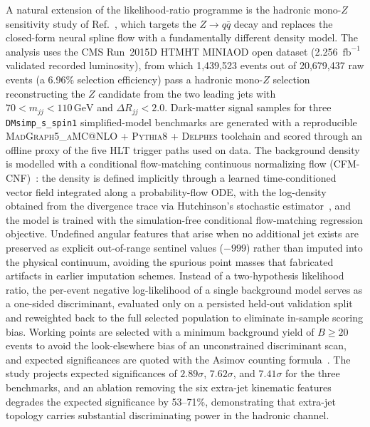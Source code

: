 \documentclass[11pt,a4paper,twocolumn]{article}
\newcommand{\GeV}{\text{GeV}}
\begin{document}
A natural extension of the likelihood-ratio programme is the hadronic mono-$Z$ sensitivity study of Ref.~\cite{Rasineni2026HadronicFlowMatching}, which targets the $Z\to q\bar{q}$ decay and replaces the closed-form neural spline flow with a fundamentally different density model. The analysis uses the CMS Run~2015D HTMHT MINIAOD open dataset (2.256~$\mathrm{fb}^{-1}$ validated recorded luminosity), from which 1{,}439{,}523 events out of 20{,}679{,}437 raw events (a 6.96\% selection efficiency) pass a hadronic mono-$Z$ selection reconstructing the $Z$ candidate from the two leading jets with $70 < m_{jj} < 110\,\GeV$ and $\Delta R_{jj} < 2.0$. Dark-matter signal samples for three \texttt{DMsimp\_s\_spin1} simplified-model benchmarks are generated with a reproducible \textsc{MadGraph5\_aMC@NLO} + \textsc{Pythia8} + \textsc{Delphes} toolchain and scored through an offline proxy of the five HLT trigger paths used on data. The background density is modelled with a conditional flow-matching continuous normalizing flow (CFM-CNF)~\cite{Lipman2023FlowMatching,Chen2018NeuralODE}: the density is defined implicitly through a learned time-conditioned vector field integrated along a probability-flow ODE, with the log-density obtained from the divergence trace via Hutchinson's stochastic estimator~\cite{Grathwohl2019FFJORD}, and the model is trained with the simulation-free conditional flow-matching regression objective. Undefined angular features that arise when no additional jet exists are preserved as explicit out-of-range sentinel values ($-999$) rather than imputed into the physical continuum, avoiding the spurious point masses that fabricated artifacts in earlier imputation schemes. Instead of a two-hypothesis likelihood ratio, the per-event negative log-likelihood of a single background model serves as a one-sided discriminant, evaluated only on a persisted held-out validation split and reweighted back to the full selected population to eliminate in-sample scoring bias. Working points are selected with a minimum background yield of $B\geq 20$ events to avoid the look-elsewhere bias of an unconstrained discriminant scan, and expected significances are quoted with the Asimov counting formula~\cite{Cowan2011Asymptotic}. The study projects expected significances of $2.89\sigma$, $7.62\sigma$, and $7.41\sigma$ for the three benchmarks, and an ablation removing the six extra-jet kinematic features degrades the expected significance by 53--71\%, demonstrating that extra-jet topology carries substantial discriminating power in the hadronic channel.
\end{document}
